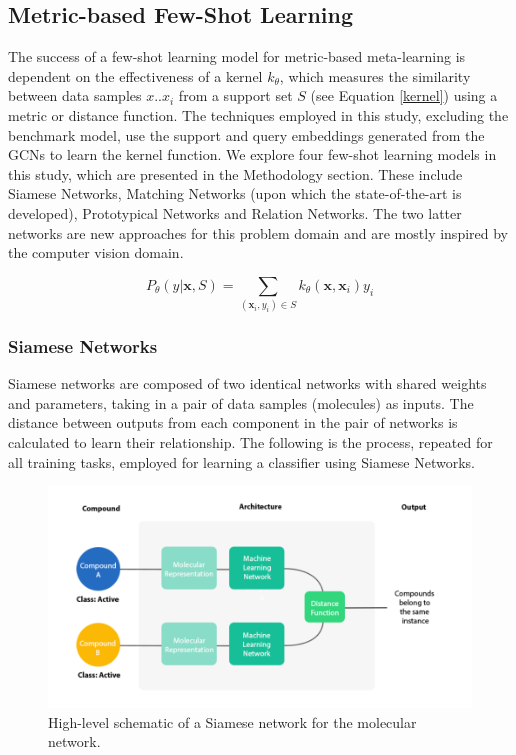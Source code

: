 \subsection{Metric-based Few-Shot Learning}

The success of a few-shot learning model for metric-based meta-learning is dependent on the effectiveness of a kernel $k_\theta$, which measures the similarity between data samples ${x..x_i}$ from a support set $S$ (see Equation \ref{kernel}) using a metric or distance function. The techniques employed in this study, excluding the benchmark model, use the support and query embeddings generated from the GCNs to learn the kernel function. We explore four few-shot learning models in this study, which are presented in the Methodology section. These include Siamese Networks, Matching Networks (upon which the state-of-the-art is developed), Prototypical Networks and Relation Networks. The two latter networks are new approaches for this problem domain and are mostly inspired by the computer vision domain.

\begin{equation}
    \label{kernel}
    P_\theta(y \vert \mathbf{x}, S) = \sum_{(\mathbf{x}_i, y_i) \in S} k_\theta(\mathbf{x}, \mathbf{x}_i)y_i
\end{equation}

\subsubsection{Siamese Networks}

Siamese networks \citep{koch2015siamese} are composed of two identical networks with shared weights and parameters, taking in a pair of data samples (molecules) as inputs. The distance between outputs from each component in the pair of networks is calculated to learn their relationship. The following is the process, repeated for all training tasks, employed for learning a classifier using Siamese Networks.

\begin{figure}[h]
    \centering
    \includegraphics[width=0.9\linewidth]{img/high-level siamese.png}
    \caption[High-level schematic of Siamese network]{High-level schematic of a Siamese network for the molecular network.}
    \label{fig:siamesenetarchi}
\end{figure}

